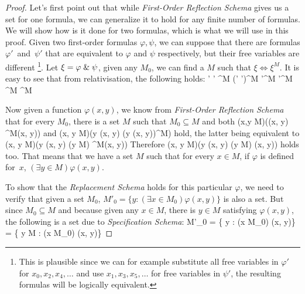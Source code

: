 \begin{proof}
Let's first point out that while \emph{First-Order Reflection Schema} gives us a set for one formula, we can generalize it to hold for any finite number of formulas. We will show how is it done for two formulas, which is what we will use in this proof. Given two first-order formulas $\varphi, \psi$, we can suppose that there are formulas $\varphi'$~and~$\psi'$ that are equivalent to $\varphi$ and $\psi$ respectively, but their free variables are different \footnote{This is plausible since we can for example substitute all free variables in $\varphi'$ for $x_0, x_2, x_4, \ldots$ and use $x_1, x_3, x_5, \ldots$ for free variables in $\psi'$, the resulting formulas will be logically equivalent.}. Let $\xi = \varphi \mathrel{\&} \psi$, given any $M_0$, we can find a $M$ such that $\xi \iff \xi^M$. It is easy to see that from relativisation, the following holds:
\beq
\varphi \et \psi \iff \varphi' \et \psi' \iff \xi \iff \xi^M \iff (\varphi' \et \psi')^M \iff \varphi'^M \et \psi'^M \iff \varphi^M \et \psi^M
\eeq

Now given a function $\varphi(x, y)$, we know from \emph{First-Order Reflection Schema} that for every $M_0$, there is a set $M$ such that $M_0 \subseteq M$ and both
\beq
(\forall x,y \in M)(\varphi(x, y) \iff \varphi^M(x, y))
\eeq 
and
\beq
(\forall x, y \in M)(\exists y \varphi(x, y) \iff (\exists y \varphi(x, y))^M)
\eeq 
hold, the latter being equivalent to 
\beq
(\forall x, y \in M)(\exists y \varphi(x, y) \iff (\exists y \in M) \varphi^M(x, y))
\eeq
Therefore 
\beq
(\forall x, y \in M)(\exists y \varphi(x, y) \iff (\exists y \in M) \varphi(x, y))
\eeq
holds too.
That means that we have a set $M$ such that for every $x \in M$, if $\varphi$ is defined for~$x$, $(\exists y \in M) \varphi(x, y)$. 

To show that the \emph{Replacement Schema} holds for this particular $\varphi$, we need to verify that given a set $M_0$, $M'_0 = \{ y : (\exists x \in M_0) \varphi(x, y)\}$ is also a set. But since $M_0 \subseteq M$ and because given any $x \in M$, there is $y \in M$ satisfying $\varphi(x, y)$, the following is a set due to \emph{Specification Schema}:
\beq
M'_0 = \{ y : (\exists x \in M_0) \varphi(x, y)\} = \{ y \in M : (\exists x \in M_0) \varphi(x, y)\}
\eeq

\ece
\end{proof}

